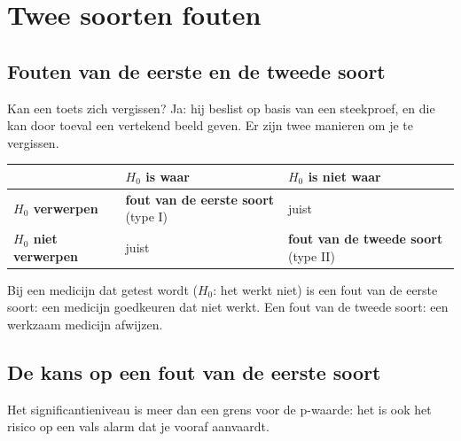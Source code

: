 \begin{oefeningen}

\end{oefeningen}

\section{Twee soorten fouten}

\subsection{Fouten van de eerste en de tweede soort}

Kan een toets zich vergissen? Ja: hij beslist op basis van een steekproef, en die kan door toeval een vertekend beeld geven. Er zijn twee manieren om je te vergissen.

\begin{theorie}
{\centering{}\renewcommand{\arraystretch}{1.6}%
\begin{tabular}{|>{\centering\arraybackslash}m{3.6cm}|>{\centering\arraybackslash}m{4.4cm}|>{\centering\arraybackslash}m{4.4cm}|}
\hline
 & \textbf{$H_0$ is waar} & \textbf{$H_0$ is niet waar} \\ \hline
\textbf{$H_0$ verwerpen} & \textbf{\textcolor{accent}{fout van de eerste soort}} (type I) & juist \\ \hline
\textbf{$H_0$ niet verwerpen} & juist & \textbf{\textcolor{accent}{fout van de tweede soort}} (type II) \\ \hline
\end{tabular}\par}
\end{theorie}

Bij een medicijn dat getest wordt ($H_0$: het werkt niet) is een fout van de eerste soort: een medicijn goedkeuren dat niet werkt. Een fout van de tweede soort: een werkzaam medicijn afwijzen.

\begin{oefeningen}
\end{oefeningen}

\subsection{De kans op een fout van de eerste soort}

Het significantieniveau is meer dan een grens voor de p-waarde: het is ook het risico op een vals alarm dat je vooraf aanvaardt.

